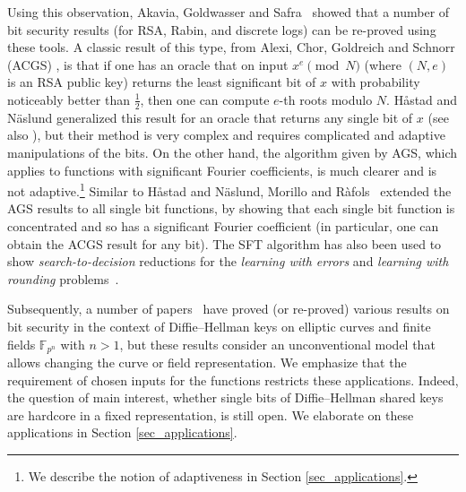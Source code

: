 \documentclass[11pt]{article}
\theoremstyle{definition}
\newcommand{\F}{{\mathbb{F}}}
\newcommand{\Z}{\mathbb{Z}}
\newcommand{\bit}{\text{bit}}
\begin{document}
Using this observation, Akavia, Goldwasser and Safra~\cite{AGS} showed that a number of bit security results (for RSA, Rabin, and discrete logs) can be re-proved using these tools.
A classic result of this type, from Alexi, Chor, Goldreich and Schnorr (ACGS) \cite{ACGS}, is that if one has an oracle that on input $x^e \pmod{N}$ (where $(N,e)$ is an RSA public key) returns the least significant bit of $x$ with probability noticeably better than $\tfrac{1}{2}$, then one can compute $e$-th roots modulo $N$.
H\r{a}stad and N{\"a}slund \cite{HN} generalized this result for an oracle that returns any single bit of $x$ (see also \cite[Section 4.1]{HardCoreSurvey}), but their method is very complex and requires complicated and adaptive manipulations of the bits.
On the other hand, the algorithm given by AGS, which applies to functions with significant Fourier coefficients, is much clearer and is not adaptive.\footnote{We describe the notion of adaptiveness in Section \ref{sec_applications}.} Similar to H\r{a}stad and N{\"a}slund, Morillo and R\`{a}fols~\cite{MR} extended the AGS results to all single bit functions, by showing that each single bit function is concentrated and so has a significant Fourier coefficient (in particular, one can obtain the ACGS result for any bit).
The SFT algorithm has also been used to show \emph{search-to-decision} reductions for the \emph{learning with errors} and \emph{learning with rounding} problems~\cite{MM,LWR_reduction}.

Subsequently, a number of papers~\cite{Duc,Fazio,MVHNP,WZZ} have proved (or re-proved) various results on bit security in the context of Diffie--Hellman keys on elliptic curves and finite fields $\F_{p^n}$ with $n > 1$, but these results consider an unconventional model that allows changing the curve or field representation.
We emphasize that the requirement of chosen inputs for the functions restricts these applications. Indeed, the question of main interest, whether single bits of Diffie--Hellman shared keys are hardcore in a fixed representation, is still open. We elaborate on these applications in Section \ref{sec_applications}.
\end{document}
